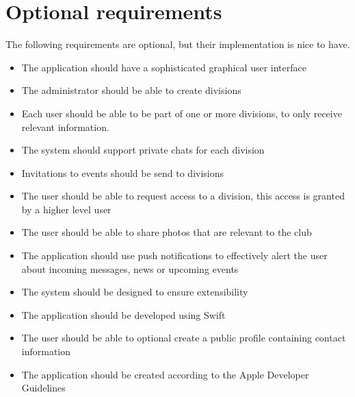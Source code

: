 \section{Optional requirements} %
The following requirements are optional, but their implementation is nice to have.
\begin{itemize}
\item The application should have a sophisticated graphical user interface
\item The administrator should be able to create divisions
\item Each user should be able to be part of one or more divisions, to only receive relevant information.
\item The system should support private chats for each division
\item Invitations to events should be send to divisions
\item The user should be able to request access to a division, this access is granted by a higher level user
\item The user should be able to share photos that are relevant to the club
\item The application should use push notifications to effectively alert the user about incoming messages, news or upcoming events
\item The system should be designed to ensure extensibility
\item The application should be developed using Swift
\item The user should be able to optional create a public profile containing contact information
\item The application should be created according to the Apple Developer Guidelines
\end{itemize}

